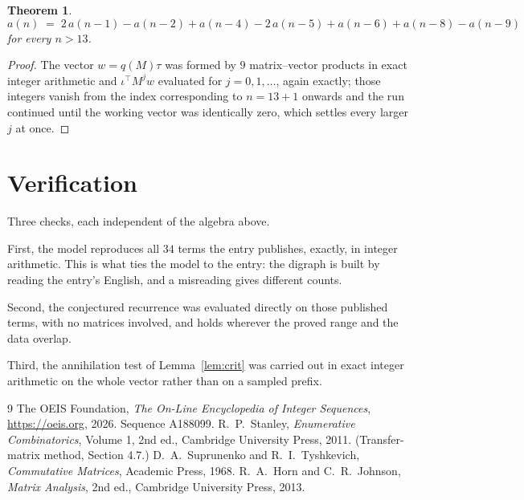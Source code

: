 \documentclass[11pt,a4paper]{article}
\theoremstyle{plain}
\newtheorem{theorem}{Theorem}
\theoremstyle{definition}
\begin{document}
\begin{theorem}
\[
a(n)\;=\;2\,a(n-1) - a(n-2) + a(n-4) - 2\,a(n-5) + a(n-6) + a(n-8) - a(n-9)
\]
for every $n>13$.
\end{theorem}

\begin{proof}
The vector $w=q(M)\tau$ was formed by $9$ matrix--vector products in exact integer
arithmetic and $\iota^{\!\top}M^{j}w$ evaluated for $j=0,1,\dots$, again exactly; those
integers vanish from the index corresponding to $n=13+1$ onwards and the run continued
until the working vector was identically zero, which settles every larger $j$ at once.
\end{proof}

\section{Verification}

Three checks, each independent of the algebra above.

First, the model reproduces all $34$ terms the entry publishes, exactly, in integer
arithmetic. This is what ties the model to the entry: the digraph is built by reading the
entry's English, and a misreading gives different counts.

Second, the conjectured recurrence was evaluated directly on those published terms, with no
matrices involved, and holds wherever the proved range and the data overlap.

Third, the annihilation test of Lemma~\ref{lem:crit} was carried out in exact integer
arithmetic on the whole vector rather than on a sampled prefix.

\begin{thebibliography}{9}
 The OEIS Foundation, \emph{The On-Line Encyclopedia of Integer
Sequences}, \url{https://oeis.org}, 2026. Sequence A188099.
 R.~P.~Stanley, \emph{Enumerative Combinatorics}, Volume 1, 2nd ed.,
Cambridge University Press, 2011. (Transfer-matrix method, Section 4.7.)
 D.~A.~Suprunenko and R.~I.~Tyshkevich, \emph{Commutative Matrices},
Academic Press, 1968.
 R.~A.~Horn and C.~R.~Johnson, \emph{Matrix Analysis}, 2nd ed., Cambridge
University Press, 2013.
\end{thebibliography}
\end{document}
